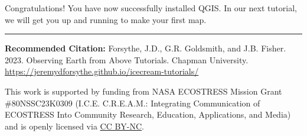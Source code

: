 \documentclass[oneside,a4paper,11pt,explicit]{book}
\begin{document}
\vspace{1em}

Congratulations! You have now successfully installed QGIS. In our next tutorial, we will get you up and running to make your first map.

\vspace{1em}


\hrule

\vspace{1em}

\small \textbf{Recommended Citation:} Forsythe, J.D., G.R. Goldsmith, and J.B. Fisher. 2023. Observing Earth from Above Tutorials. Chapman University. \url{https://jeremydforsythe.github.io/icecream-tutorials/}

\vspace{1em}

This work is supported by funding from NASA ECOSTRESS Mission Grant \#80NSSC23K0309 (I.C.E. C.R.E.A.M.: Integrating Communication of ECOSTRESS Into Community Research, Education, Applications, and Media) and is openly licensed via \href{https://creativecommons.org/licenses/by-nc/4.0/}{CC BY-NC}.
\end{document}
